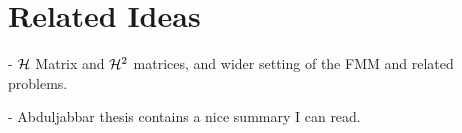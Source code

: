 \section{Related Ideas}\label{chpt:fmm:sec:related}

- $\mathcal{H}$ Matrix and $\mathcal{H}^2$ matrices, and wider setting of the FMM and related problems.

- Abduljabbar thesis contains a nice summary I can read.
